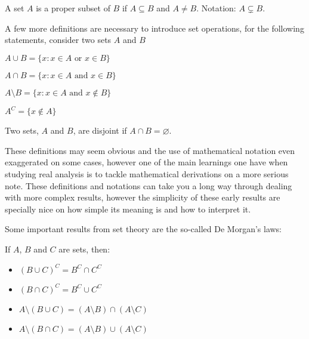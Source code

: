 \begin{definition}
    A set $A$ is a proper subset of $B$ if $A \subseteq B$ and $A \neq B$. Notation: $A \subsetneq B$.
\end{definition}

A few more definitions are necessary to introduce set operations, for the following statements, consider two sets $A$ and $B$

\begin{definition}
    $A \cup B = \{ x: x \in A \text{ or } x \in B\}$
\end{definition}

\begin{definition}
    $A \cap B = \{ x: x \in A \text{ and } x \in B\}$
\end{definition}

\begin{definition}
    $A \setminus B = \{ x : x \in A \text { and } x \notin B\}$
\end{definition}

\begin{definition}
    $A^C = \{ x \notin A \}$
\end{definition}

\begin{definition}
    Two sets, $A$ and $B$, are disjoint if $A \cap B = \varnothing$.
\end{definition}

These definitions may seem obvious and the use of mathematical notation even exaggerated on some cases, however one of the main learnings one have when studying real analysis is to tackle mathematical derivations on a more serious note. These definitions and notations can take you a long way through dealing with more complex results, however the simplicity of these early results are specially nice on how simple its meaning is and how to interpret it.

Some important results from set theory are the so-called De Morgan's laws:

\newpage

\begin{theorem}
    If $A$, $B$ and $C$ are sets, then:
    \begin{itemize}
        \item $(B \cup C)^C = B^C \cap C^C$
        \item $(B \cap C)^C = B^C \cup C^C$
        \item $A \setminus (B \cup C) = (A \setminus B) \cap (A \setminus C)$
        \item $A \setminus (B \cap C) = (A \setminus B) \cup (A \setminus C)$
    \end{itemize}
\end{theorem}

